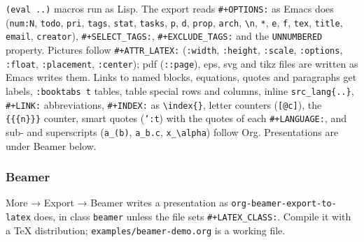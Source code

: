\documentclass[11pt]{article}
\begin{document}
\texttt{(eval ..)} macros run as Lisp. The export reads \texttt{\#+OPTIONS:} as Emacs does (\texttt{num:N}, \texttt{todo}, \texttt{pri}, \texttt{tags}, \texttt{stat}, \texttt{tasks}, \texttt{p}, \texttt{d}, \texttt{prop}, \texttt{arch}, \texttt{\textbackslash{}n}, \texttt{*}, \texttt{e}, \texttt{f}, \texttt{tex}, \texttt{title}, \texttt{email}, \texttt{creator}), \texttt{\#+SELECT\_TAGS:}, \texttt{\#+EXCLUDE\_TAGS:} and the \texttt{UNNUMBERED} property. Pictures follow \texttt{\#+ATTR\_LATEX:} (\texttt{:width}, \texttt{:height}, \texttt{:scale}, \texttt{:options}, \texttt{:float}, \texttt{:placement}, \texttt{:center}); pdf (\texttt{::page}), eps, svg and tikz files are written as Emacs writes them. Links to named blocks, equations, quotes and paragraphs get labels, \texttt{:booktabs t} tables, table special rows and columns, inline \texttt{src\_lang\{..\}}, \texttt{\#+LINK:} abbreviations, \texttt{\#+INDEX:} as \texttt{\textbackslash{}index\{\}}, letter counters (\texttt{[@c]}), the \texttt{\{\{\{n\}\}\}} counter, smart quotes (\texttt{':t}) with the quotes of each \texttt{\#+LANGUAGE:}, and sub- and superscripts (\texttt{a\_(b)}, \texttt{a\_b.c}, \texttt{x\_\textbackslash{}alpha}) follow Org. Presentations are under Beamer below.

\subsubsection{Beamer}
\label{sec:org2ea0ade}

More → Export → Beamer writes a presentation as \texttt{org-beamer-export-to-latex} does, in class \texttt{beamer} unless the file sets \texttt{\#+LATEX\_CLASS:}. Compile it with a \TeX{} distribution; \texttt{examples/beamer-demo.org} is a working file.
\end{document}
